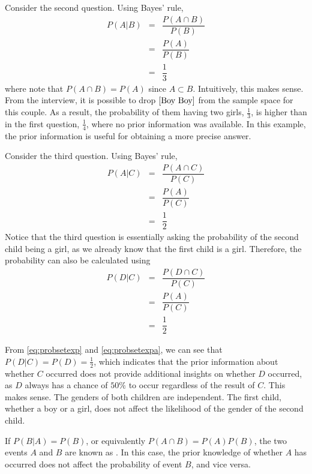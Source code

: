 Consider the second question. Using Bayes' rule,
\begin{eqnarray}
P(A|B) &=& \dfrac{P\left(A \cap B\right)}{P(B)} \nonumber \\
&=& \dfrac{P(A)}{P(B)} \nonumber \\
&=& \dfrac{1}{3} \nonumber
\end{eqnarray}
where note that $P\left(A \cap B\right) = P(A)$ since $A\subset B$. Intuitively, this makes sense. From the interview, it is possible to drop $\left[\textup{Boy Boy}\right]$ from the sample space for this couple. As a result, the probability of them having two girls, $\frac{1}{3}$, is higher than in the first question, $\frac{1}{4}$, where no prior information was available. In this example, the prior information is useful for obtaining a more precise answer.

Consider the third question. Using Bayes' rule,
\begin{eqnarray}
	P(A|C) &=& \dfrac{P\left(A \cap C\right)}{P(C)} \nonumber \\
	&=& \dfrac{P(A)}{P(C)} \nonumber \\
	&=& \dfrac{1}{2} \nonumber
\end{eqnarray}
Notice that the third question is essentially asking the probability of the second child being a girl, as we already know that the first child is a girl. Therefore, the probability can also be calculated using
\begin{eqnarray}
	P(D|C) &=& \dfrac{P\left(D \cap C\right)}{P(C)} \nonumber \\
	&=& \dfrac{P(A)}{P(C)} \nonumber \\
	&=& \dfrac{1}{2} \label{eq:probsetexpa}
\end{eqnarray}

From \eqref{eq:probsetexp} and \eqref{eq:probsetexpa}, we can see that $P(D|C) = P(D) = \frac{1}{2}$, which indicates that the prior information about whether $C$ occurred does not provide additional insights on whether $D$ occurred, as $D$ always has a chance of $50\%$ to occur regardless of the result of $C$. This makes sense. The genders of both children are independent. The first child, whether a boy or a girl, does not affect the likelihood of the gender of the second child.

If $P(B|A)=P(B)$, or equivalently $P(A\cap B) = P(A)P(B)$, the two events $A$ and $B$ are known as . In this case, the prior knowledge of whether $A$ has occurred does not affect the probability of event $B$, and vice versa.


